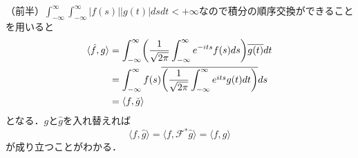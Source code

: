 \documentclass[dvipdfmx,a4j,10pt]{jsarticle}
\makeatletter
\theoremstyle{mystyle1}
\theoremstyle{mystyle3}
\theoremstyle{mystyle4}
\theoremstyle{mystyle6}
\theoremstyle{mystyle2}
\theoremstyle{mystyle5}
\renewenvironment{proof}[1][\proofname]{\par
  \pushQED{\qed}%
  \normalfont
  \topsep6\p@\@plus6\p@ \trivlist
  \item[\hskip\labelsep{\bfseries\sffamily #1}]\ignorespaces
}{%
  \popQED\endtrivlist\@endpefalse
}
\renewcommand\proofname{証明}
\makeatother
\begin{document}
\begin{proof}
	（前半）$\int_{-\infty}^\infty\int_{-\infty}^\infty|f(s)||g(t)|dsdt<+\infty$なので積分の順序交換ができることを用いると
	\[
		\begin{split}
			\langle \hat f,g \rangle
			&=\int_{-\infty}^\infty \mleft(\frac{1}{\sqrt{2\pi}}\int_{-\infty}^\infty e^{-its}f(s)ds\mright)\overline{g(t)}dt \\
			&=\int_{-\infty}^\infty f(s)\overline{\mleft(\frac{1}{\sqrt{2\pi}}\int_{-\infty}^\infty e^{its}g(t)dt\mright)}ds \\
			&=\langle f,\check g\rangle
		\end{split}
	\]
	となる．$g$と$\hat g$を入れ替えれば
	\[
		\langle \hat f,\hat g\rangle=\langle f,\mathcal{F}^*\hat g\rangle=\langle f,g\rangle
	\]
	が成り立つことがわかる．


\end{proof}
\end{document}
